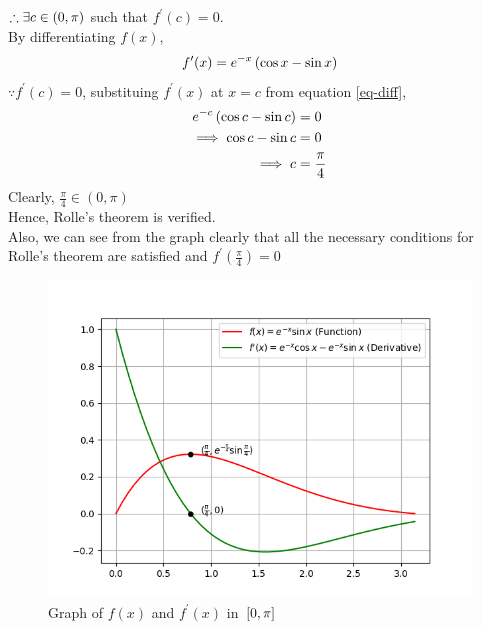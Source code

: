 \documentclass[journal,12pt,twocolumn]{IEEEtran}
\begin{document}
$\therefore \exists c \in \left(0, \pi\right)$ such that $f^\prime(c) = 0$.\\
By differentiating $f(x)$, 
\begin{align}
    \label{eq-diff}
    f^\prime (x) = e^{-x}\left(\cos x - \sin x\right)
\end{align}
$\because f^\prime(c) = 0$, substituing $f^\prime(x)$ at $x=c$ from equation \eqref{eq-diff},
\begin{align}
    e^{-c} \left(\cos c - \sin c\right) &= 0
    \\
    \implies \cos c - \sin c &= 0
    \\
    \implies c &= \frac{\pi}{4}
\end{align}
Clearly, $\frac{\pi}{4} \in (0,\pi)$\\
Hence, Rolle's theorem is verified.\\
Also, we can see from the graph clearly that all the necessary conditions for Rolle's theorem are satisfied and $f^\prime(\frac{\pi}{4}) = 0$
\begin{figure}[ht!]
	  \centering 
	  \includegraphics[width=\columnwidth]{Figs/Figure_1.png}
	  \caption{Graph of $f(x)$ and $f^\prime(x)$ in ${}\left[0,\pi\right]$}
	  \label{fig-1}
\end{figure}
\end{document}
